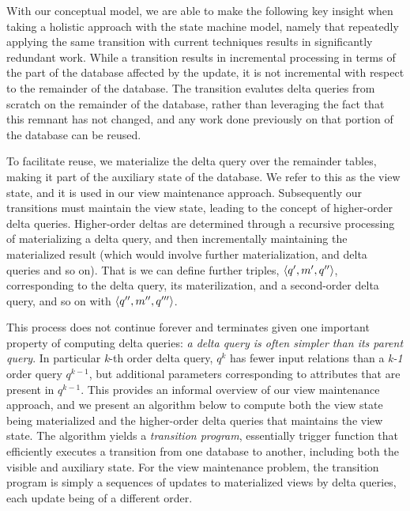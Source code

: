 {With our conceptual model, we are able to make the
following key insight when taking a holistic approach with the state machine
model, namely that repeatedly applying the same transition with current
techniques results in significantly redundant work. While a transition results
in incremental processing in terms of the part of the database affected by the
update, it is not incremental with respect to the remainder of the database. The
transition evalutes delta queries from scratch on the remainder of the database,
rather than leveraging the fact that this remnant has not changed, and any work
done previously on that portion of the database can be reused.

To facilitate reuse, we materialize the delta query over the remainder tables,
making it part of the auxiliary state of the database. We refer to this as the
view state, and it is used in our view maintenance approach. Subsequently our
transitions must maintain the view state, leading to the concept of higher-order
delta queries. Higher-order deltas are determined through a recursive processing
of materializing a delta query, and then incrementally maintaining the
materialized result (which would involve further materialization, and delta
queries and so on). That is we can define further triples,
${\langle q', m', q''\rangle}$, corresponding to the delta query, its materilization,
and a second-order delta query, and so on with ${\langle q'',m'',q'''\rangle}$.

This process does not continue forever and terminates given one important
property of computing delta queries: \textit{a delta query is often simpler than
its parent query}. In particular \textit{k}-th order delta query, $q^k$ has
fewer input relations than a \textit{k-1} order query $q^{k-1}$, but additional
parameters corresponding to attributes that are present in $q^{k-1}$. This
provides an informal overview of our view maintenance approach, and we present
an algorithm below to compute both the view state being materialized and the
higher-order delta queries that maintains the view state. The algorithm yields a
\textit{transition program}, essentially trigger function that efficiently
executes a transition from one database to another, including both the visible
and auxiliary state. For the view maintenance problem, the transition program is
simply a sequences of updates to materialized views by delta queries, each
update being of a different order.

}
